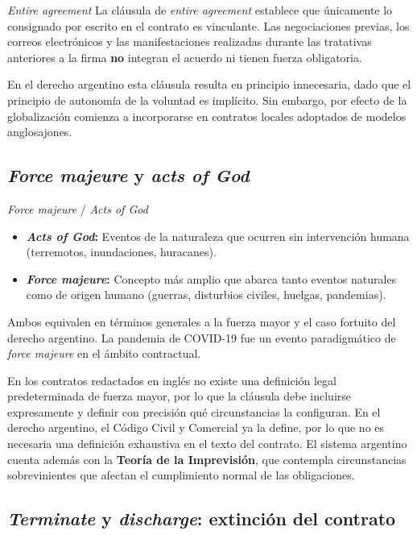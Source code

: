 \documentclass[12pt,oneside]{book}
\begin{document}
\begin{definition}{\textit{Entire agreement}}
La cláusula de \textit{entire agreement} establece que únicamente lo consignado por escrito en el contrato es vinculante. Las negociaciones previas, los correos electrónicos y las manifestaciones realizadas durante las tratativas anteriores a la firma \textbf{no} integran el acuerdo ni tienen fuerza obligatoria.
\end{definition}

En el derecho argentino esta cláusula resulta en principio innecesaria, dado que el principio de autonomía de la voluntad es implícito. Sin embargo, por efecto de la globalización comienza a incorporarse en contratos locales adoptados de modelos anglosajones.

\subsection{\textit{Force majeure} y \textit{acts of God}}

\begin{definition}{\textit{Force majeure} / \textit{Acts of God}}
\begin{itemize}
    \item \textbf{\textit{Acts of God}:} Eventos de la naturaleza que ocurren sin intervención humana (terremotos, inundaciones, huracanes).
    \item \textbf{\textit{Force majeure}:} Concepto más amplio que abarca tanto eventos naturales como de origen humano (guerras, disturbios civiles, huelgas, pandemias).
\end{itemize}
Ambos equivalen en términos generales a la fuerza mayor y el caso fortuito del derecho argentino. La pandemia de COVID-19 fue un evento paradigmático de \textit{force majeure} en el ámbito contractual.
\end{definition}

En los contratos redactados en inglés no existe una definición legal predeterminada de fuerza mayor, por lo que la cláusula debe incluirse expresamente y definir con precisión qué circunstancias la configuran. En el derecho argentino, el Código Civil y Comercial ya la define, por lo que no es necesaria una definición exhaustiva en el texto del contrato. El sistema argentino cuenta además con la \textbf{Teoría de la Imprevisión}, que contempla circunstancias sobrevinientes que afectan el cumplimiento normal de las obligaciones.

\subsection{\textit{Terminate} y \textit{discharge}: extinción del contrato}
\end{document}
